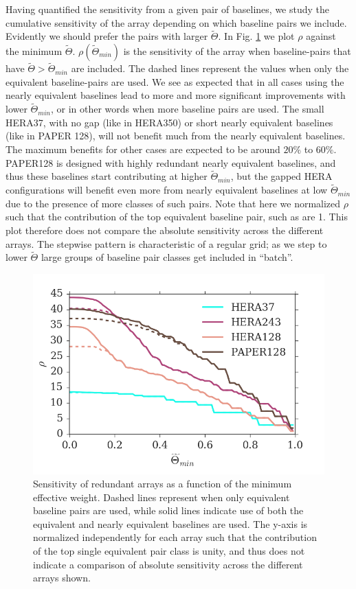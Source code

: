 \documentclass[twocolumn,apj,numberedappendix]{emulateapj}
\renewcommand\[{\begin{equation}}
\renewcommand\]{\end{equation}}
\begin{document}
Having quantified the sensitivity from a given pair of baselines, we study the cumulative sensitivity of the array depending on which baseline pairs we include. Evidently we should prefer the pairs with larger $\widetilde{\Theta}$. In Fig. \ref{fig:osens} we plot $\rho$ against the minimum $\widetilde{\Theta}$. $\rho(\widetilde{\Theta}_{min})$ is the sensitivity of the array when baseline-pairs that have $\widetilde{\Theta}>\widetilde{\Theta}_{min}$ are included. The dashed lines represent the values when only the equivalent baseline-pairs are used.  We see as expected that in all cases using the nearly equivalent baselines lead to more and more significant improvements with lower $\widetilde{\Theta}_{min}$, or in other words when more baseline pairs are used. The small HERA37, with no gap (like in HERA350) or short nearly equivalent baselines (like in PAPER 128), will not benefit much from the nearly equivalent baselines. The maximum benefits for other cases are expected to be around $20\%$ to $60\%$. PAPER128 is designed with highly redundant nearly equivalent baselines, and thus  these baselines start contributing at higher $\widetilde{\Theta}_{min}$, but the gapped HERA configurations will benefit even more from nearly equivalent baselines at low $\widetilde{\Theta}_{min}$ due to the presence of more classes of such pairs. Note that here we normalized $\rho$ such that the contribution of the top equivalent baseline pair, such as are 1. This plot therefore does not compare the absolute sensitivity across the different arrays. The stepwise pattern is characteristic of a regular grid; as we step to lower $\widetilde{\Theta}$ large groups of baseline pair classes get included in ``batch''. 
\begin{figure}[H]
\includegraphics[width=\linewidth]{osens}
\caption{Sensitivity of redundant arrays as a function of the minimum effective weight. Dashed lines represent when only equivalent baseline pairs are used, while solid lines indicate use of both the equivalent and nearly equivalent baselines are used. The y-axis is normalized independently for each array such that the contribution of the top single equivalent pair class is unity, and thus does not indicate a comparison of absolute sensitivity across the different arrays shown.  }
\label{fig:osens}
\end{figure}
\end{document}
